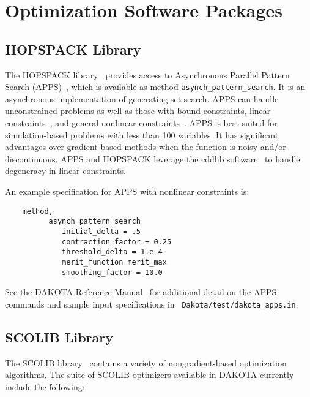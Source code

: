 \section{Optimization Software Packages}\label{opt:software}

\subsection{HOPSPACK Library}\label{opt:software:apps}

The HOPSPACK library~\cite{Plantenga2009} provides access to
Asynchronous Parallel Pattern Search (APPS)~\cite{GrKo06}, which is
available as method \texttt{asynch\_pattern\_search}.  It is an
asynchronous implementation of generating set search.  APPS can handle
unconstrained problems as well as those with bound constraints, linear
constraints~\cite{GrKoLe08}, and general nonlinear
constraints~\cite{GrKo07}.  APPS is best suited for simulation-based
problems with less than 100 variables.  It has significant advantages
over gradient-based methods when the function is noisy and/or
discontinuous.  APPS and HOPSPACK leverage the cddlib
software~\cite{Fu05} to handle degeneracy in linear constraints.

An example specification for APPS with nonlinear constraints is:
\begin{small}
\begin{verbatim}
    method,
          asynch_pattern_search
             initial_delta = .5
             contraction_factor = 0.25
             threshold_delta = 1.e-4
             merit_function merit_max
             smoothing_factor = 10.0
\end{verbatim}
\end{small} %

See the DAKOTA Reference Manual~\cite{RefMan} for additional detail on
the APPS commands and sample input specifications in {\tt
Dakota/test/dakota\_apps.in}.

\subsection{SCOLIB Library}\label{opt:software:coliny}

The SCOLIB library~\cite{Har06} contains a variety of
nongradient-based optimization algorithms. The suite of SCOLIB
optimizers available in DAKOTA currently include the following:

